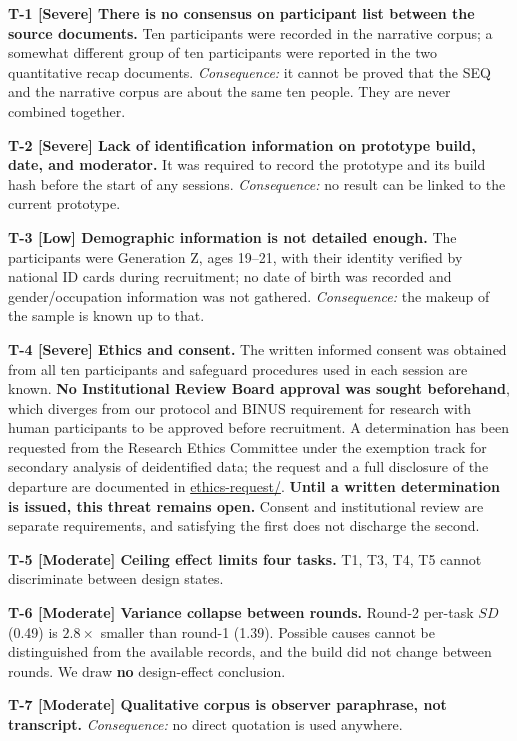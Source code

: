 \documentclass[conference]{IEEEtran}
\begin{document}
\textbf{T-1 [Severe] There is no consensus on participant list between the source documents.} Ten participants were recorded in the narrative corpus; a somewhat different group of ten participants were reported in the two quantitative recap documents. \emph{Consequence:} it cannot be proved that the SEQ and the narrative corpus are about the same ten people. They are never combined together.

\textbf{T-2 [Severe] Lack of identification information on prototype build, date, and moderator.} It was required to record the prototype and its build hash before the start of any sessions. \emph{Consequence:} no result can be linked to the current prototype.

\textbf{T-3 [Low] Demographic information is not detailed enough.} The participants were Generation Z, ages 19–21, with their identity verified by national ID cards during recruitment; no date of birth was recorded and gender/occupation information was not gathered. \emph{Consequence:} the makeup of the sample is known up to that.

\textbf{T-4 [Severe] Ethics and consent.} The written informed consent was obtained from all ten participants and safeguard procedures used in each session are known. \textbf{No Institutional Review Board approval was sought beforehand}, which diverges from our protocol and BINUS requirement for research with human participants to be approved before recruitment. A determination has been requested from the Research Ethics Committee under the
exemption track for secondary analysis of deidentified data; the request and a full disclosure of the
departure are documented in \url{ethics-request/}. \textbf{Until a written determination is issued,
this threat remains open.} Consent and institutional review are separate requirements, and satisfying
the first does not discharge the second.

\textbf{T-5 [Moderate] Ceiling effect limits four tasks.} T1, T3, T4, T5 cannot
discriminate between design states.

\textbf{T-6 [Moderate] Variance collapse between rounds.} Round-2 per-task $SD$
(0.49) is $2.8\times$ smaller than round-1 (1.39). Possible causes cannot be
distinguished from the available records, and the build did not change between
rounds. We draw \textbf{no} design-effect conclusion.

\textbf{T-7 [Moderate] Qualitative corpus is observer paraphrase, not
transcript.} \emph{Consequence:} no direct quotation is used anywhere.
\end{document}
